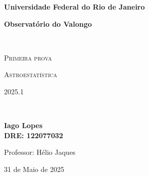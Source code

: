 
\begin{titlepage}
\centering
{\bfseries\LARGE Universidade Federal do Rio de Janeiro \par}
\vspace{0.1cm}
{\bfseries\LARGE Observatório do Valongo \par}
\vfill
\noindent\hrulefill \\
{\scshape\Huge Primeira prova\par} %
\vspace{0.5cm}
{\scshape\Large Astroestatística \par}
\vspace{0.5cm}
{\scshape\Large 2025.1 \par} %
\noindent\hrulefill \\
\vfill
{\bfseries\Large Iago Lopes\\ \small DRE: 122077032 \par}
\vfill
{\Large Professor: Hélio Jaques \par}
\vfill
{\large 31 de Maio de 2025 \par} %
\end{titlepage}
\setcounter{page}{1}
\newpage